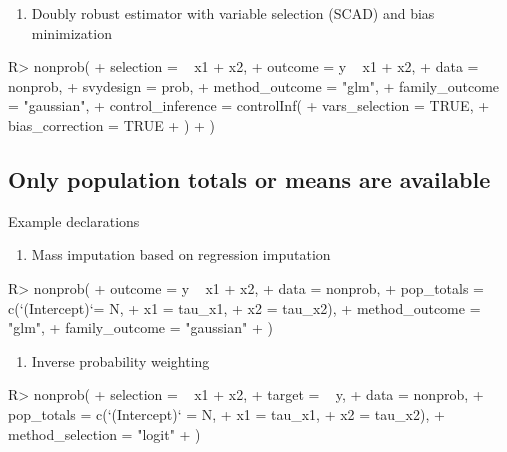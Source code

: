 \documentclass[
]{jss}
\providecommand{\tightlist}{%
  \setlength{\itemsep}{0pt}\setlength{\parskip}{0pt}}
\begin{document}
\begin{enumerate}
\def\labelenumi{\arabic{enumi}.}
\setcounter{enumi}{8}
\tightlist
\item
  Doubly robust estimator with variable selection (SCAD) and bias
  minimization
\end{enumerate}

\begin{CodeChunk}
\begin{CodeInput}
R> nonprob(
+   selection = ~ x1 + x2, 
+   outcome = y ~ x1 + x2, 
+   data = nonprob, 
+   svydesign = prob,
+   method_outcome = "glm", 
+   family_outcome = "gaussian", 
+   control_inference = controlInf(
+     vars_selection = TRUE, 
+     bias_correction = TRUE
+   )
+ )
\end{CodeInput}
\end{CodeChunk}

\subsection{Only population totals or means are
available}\label{only-population-totals-or-means-are-available}

Example declarations

\begin{enumerate}
\def\labelenumi{\arabic{enumi}.}
\tightlist
\item
  Mass imputation based on regression imputation
\end{enumerate}

\begin{CodeChunk}
\begin{CodeInput}
R> nonprob(
+   outcome = y ~ x1 + x2,
+   data = nonprob,
+   pop_totals = c(`(Intercept)`= N,
+                  x1 = tau_x1,
+                  x2 = tau_x2),
+   method_outcome = "glm",
+   family_outcome = "gaussian"
+ )
\end{CodeInput}
\end{CodeChunk}

\begin{enumerate}
\def\labelenumi{\arabic{enumi}.}
\setcounter{enumi}{1}
\tightlist
\item
  Inverse probability weighting
\end{enumerate}

\begin{CodeChunk}
\begin{CodeInput}
R> nonprob(
+   selection =  ~ x1 + x2, 
+   target = ~ y, 
+   data = nonprob, 
+   pop_totals = c(`(Intercept)` = N, 
+                  x1 = tau_x1, 
+                  x2 = tau_x2), 
+   method_selection = "logit"
+ )
\end{CodeInput}
\end{CodeChunk}
\end{document}
